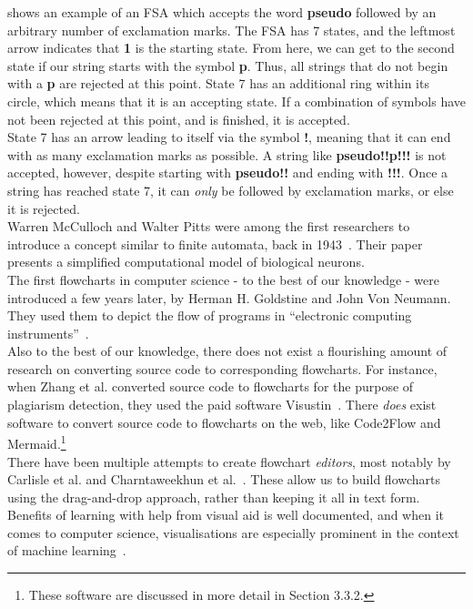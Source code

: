  shows an example of an FSA which accepts the word \textbf{pseudo} followed by an arbitrary number of exclamation marks. The FSA has 7 states, and the leftmost arrow indicates that \textbf{1} is the starting state. From here, we can get to the second state if our string starts with the symbol \textbf{p}. Thus, all strings that do not begin with a \textbf{p} are rejected at this point. State 7 has an additional ring within its circle, which means that it is an accepting state. If a combination of symbols have not been rejected at this point, and is finished, it is accepted. \\

State 7 has an arrow leading to itself via the symbol \textbf{!}, meaning that it can end with as many exclamation marks as possible. A string like \textbf{pseudo!!p!!!} is not accepted, however, despite starting with \textbf{pseudo!!} and ending with \textbf{!!!}. Once a string has reached state 7, it can \textit{only} be followed by exclamation marks, or else it is rejected. \\

Warren McCulloch and Walter Pitts were among the first researchers to introduce a concept similar to finite automata, back in 1943~\cite{firstFSA}. Their paper presents a simplified computational model of biological neurons. \\

The first flowcharts in computer science - to the best of our knowledge - were introduced a few years later, by Herman H. Goldstine and John Von Neumann. They used them to depict the flow of programs in ``electronic computing instruments''~\cite{flowchartIn40s}. \\

Also to the best of our knowledge, there does not exist a flourishing amount of research on converting source code to corresponding flowcharts. For instance, when Zhang et al. converted source code to flowcharts for the purpose of plagiarism detection, they used the paid software Visustin~\cite{paperOnPlagiarism}. There \textit{does} exist software to convert source code to flowcharts on the web, like Code2Flow and Mermaid.\footnote{These software are discussed in more detail in Section 3.3.2.} \\

There have been multiple attempts to create flowchart \textit{editors}, most notably by Carlisle et al. and Charntaweekhun et al.~\cite{flowchartEditor1, flowchartEditor2}. These allow us to build flowcharts using the drag-and-drop approach, rather than keeping it all in text form. Benefits of learning with help from visual aid is well documented, and when it comes to computer science, visualisations are especially prominent in the context of machine learning~\cite{ML_Visual1, ML_Visual2, ML_Visual3}. \\

